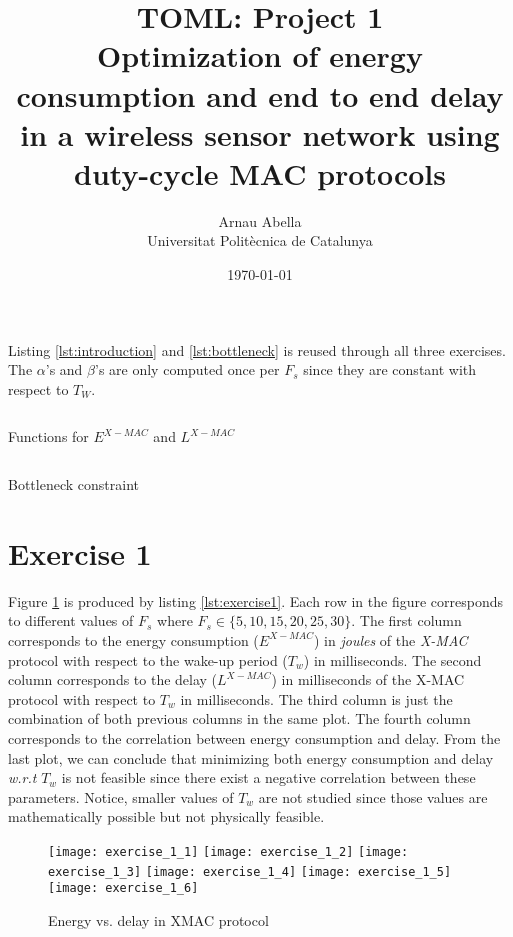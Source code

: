\documentclass[12pt, a4paper]{article}
\title{%
  \vspace{-10ex}
  TOML: Project 1\\
  \large{Optimization of energy consumption and end to end delay in a wireless sensor network using duty-cycle MAC protocols}
}
\author{%
  Arnau Abella \\
  \large{Universitat Polit\`ecnica de Catalunya}
}
\date{\today}
\begin{document}
\maketitle


Listing \ref{lst:introduction} and \ref{lst:bottleneck} is reused through all three exercises.
The $\alpha$'s and $\beta$'s are only computed once per $F_{s}$ since they are constant with respect to $T_{W}$.
\begin{listing}[H]
  \inputminted[firstline=34, lastline=58, breaklines=true,fontsize=\footnotesize]{python}{../code/main.py}
  \caption{Functions for $E^{X-MAC}$ and $L^{X-MAC}$}
  \label{lst:introduction}
\end{listing}

\begin{listing}[H]
  \inputminted[firstline=98, lastline=104, breaklines=true,fontsize=\footnotesize]{python}{../code/main.py}
  \caption{Bottleneck constraint}
  \label{lst:bottleneck}
\end{listing}

\section*{Exercise 1}%
\label{sec:exercise1}

Figure \ref{fig:exercise1} is produced by listing \ref{lst:exercise1}. Each row in the figure corresponds to different values of $F_{s}$ where $F_{s} \in \{5, 10, 15, 20, 25, 30\}$. The first column corresponds to the energy consumption ($E^{X-MAC}$) in \textit{joules} of the \textit{X-MAC} protocol with respect to the wake-up period ($T_{w}$) in milliseconds. The second column corresponds to the delay ($L^{X-MAC}$) in milliseconds of the X-MAC protocol with respect to $T_{w}$ in milliseconds. The third column is just the combination of both previous columns in the same plot. The fourth column corresponds to the correlation between energy consumption and delay. From the last plot, we can conclude that minimizing both energy consumption and delay \textit{w.r.t} $T_{w}$ is not feasible since there exist a negative correlation between these parameters. Notice, smaller values of $T_{w}$ are not studied since those values are mathematically possible but not physically feasible.

\begin{figure}[H]
  \centering
  \texttt{[image: exercise\_1\_1]}\hfill
  \texttt{[image: exercise\_1\_2]}\hfill
  \texttt{[image: exercise\_1\_3]}\hfill
  \texttt{[image: exercise\_1\_4]}\hfill
  \texttt{[image: exercise\_1\_5]}\hfill
  \texttt{[image: exercise\_1\_6]}
  \caption{Energy vs. delay in XMAC protocol}
  \label{fig:exercise1}
\end{figure}
\end{document}
